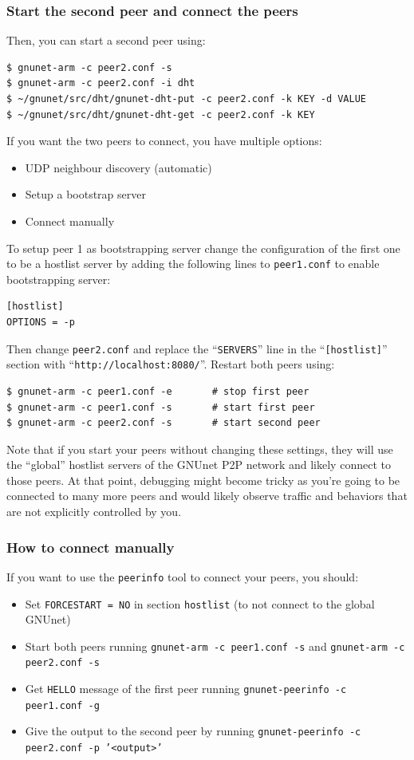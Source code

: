 \documentclass[10pt]{article}
\begin{document}
\subsubsection{Start the second peer and connect the peers}

Then, you can start a second peer using:
\lstset{language=bash}
\begin{lstlisting}
$ gnunet-arm -c peer2.conf -s
$ gnunet-arm -c peer2.conf -i dht
$ ~/gnunet/src/dht/gnunet-dht-put -c peer2.conf -k KEY -d VALUE
$ ~/gnunet/src/dht/gnunet-dht-get -c peer2.conf -k KEY
\end{lstlisting}
If you want the two peers to connect, you have multiple options:
\begin{itemize}
\itemsep0em
  \item UDP neighbour discovery (automatic)
  \item Setup a bootstrap server
  \item Connect manually
\end{itemize}
To setup peer 1 as bootstrapping server change the configuration of
the first one to be a hostlist server by adding the following lines to
\texttt{peer1.conf} to enable bootstrapping server:
 \begin{verbatim}
[hostlist]
OPTIONS = -p
\end{verbatim}

Then change {\tt peer2.conf} and replace the ``\texttt{SERVERS}'' line in the ``\texttt{[hostlist]}'' section with
``\texttt{http://localhost:8080/}''.  Restart both peers using:
\begin{lstlisting}
$ gnunet-arm -c peer1.conf -e		# stop first peer
$ gnunet-arm -c peer1.conf -s		# start first peer
$ gnunet-arm -c peer2.conf -s		# start second peer
\end{lstlisting}

Note that if you start your peers without changing these settings, they
will use the ``global'' hostlist servers of the GNUnet P2P network and
likely connect to those peers.  At that point, debugging might become
tricky as you're going to be connected to many more peers and would
likely observe traffic and behaviors that are not explicitly controlled
by you.

\subsubsection{How to connect manually}

If you want to use the \texttt{peerinfo} tool to connect your peers, you should:
\begin{itemize}
\itemsep0em
 \item{Set {\tt FORCESTART = NO} in section {\tt hostlist} (to not connect to the global GNUnet)}
 \item{Start both peers running {\tt gnunet-arm -c peer1.conf -s} and {\tt gnunet-arm -c peer2.conf -s}}
 \item{Get \texttt{HELLO} message of the first peer running {\tt gnunet-peerinfo -c peer1.conf -g}}
 \item{Give the output to the second peer by running {\tt gnunet-peerinfo -c peer2.conf -p '<output>'}}
\end{itemize}
\end{document}
